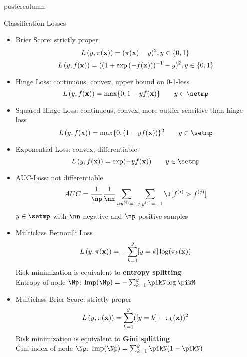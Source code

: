 \documentclass{beamer}
\begin{document}
\begin{frame}[fragile]{}
\begin{columns}
\begin{column}{.31\textwidth}
\begin{beamercolorbox}[center]{postercolumn}
\begin{minipage}{.98\textwidth}
{\begin{myblock}{Classification Losses}
\begin{itemize}[$\bullet$]
        \item Brier Score: strictly proper
        $$ L\left(y, \pi(\mathbf{x})\right) = (\pi(\mathbf{x}) - y)^2, y \in \{0, 1\} $$
        $$ L\left(y, f(\mathbf{x})\right)=((1+\exp{(-f(\mathbf{x}))})^{-1}-y)^2, y \in \{0, 1\} $$

        \item Hinge Loss: continuous, convex, upper bound on 0-1-loss 
        $$ \Lxy = \max \{ 0, 1 - y\fx \} \qquad y \in \setmp $$
        
        \item Squared Hinge Loss: continuous, convex, more outlier-sensitive than hinge loss
        $$ \Lxy = \max \{ 0, (1 - y\fx)\}^2 \qquad y \in \setmp $$
        
        \item Exponential Loss: convex, differentiable
        $$ \Lxy = \exp(-y\fx) \qquad y \in \setmp $$ 
        
        \item AUC-Loss: not differentiable
         $$AUC = \frac{1}{\np} \frac{1}{\nn} \sum_{i: \yi = 1} \sum_{j: \yi[j] = -1} \I [f^{(i)} > f^{(j)}]$$
         $y \in \setmp$ with $\nn$ negative and $\np$ positive samples


        \item Multiclass Bernoulli Loss
        $$ L\left(y, \pi(\mathbf{x})\right) = -\sum_{k = 1}^g [y = k] \log (\pi_k(\mathbf{x})) $$
        Risk minimization is equivalent to \textbf{entropy splitting}\\
        Entropy of node $\Np$: $\text{Imp}(\Np) = -\textstyle\sum_{k = 1}^g \pikN \log \pikN$

        \item Multiclass Brier Score: strictly proper
        $$ L\left(y, \pi(\mathbf{x})\right) = \sum_{k = 1}^g ([y = k] - \pi_k(\mathbf{x}))^2 $$
        Risk minimization is equivalent to \textbf{Gini splitting}\\
        Gini index of node $\Np$: $\text{Imp}(\Np) = \sum_{k=1}^g \pikN (1-\pikN)$

\end{itemize}

\end{myblock}

  }
  
  \end{minipage}
  \end{beamercolorbox}
  \end{column}
  
  
  
\end{columns}
\end{frame}
\end{document}
